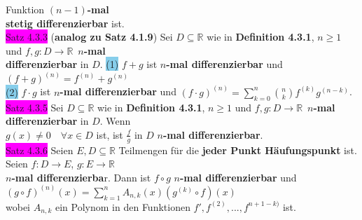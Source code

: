 \documentclass[10pt]{article}
\begin{document}
                Funktion \textbf{$(n-1)$-mal \\
        \indent stetig differenzierbar} ist.\\
\colorbox{magenta}{Satz 4.3.3} (\textbf{analog zu Satz 4.1.9}) Sei 
                \textcolor{NavyBlue}{$D\subseteq\mathbb{R}$} wie in 
                \textbf{Definition 4.3.1}, \textcolor{NavyBlue}{$n\geqslant1$} und 
                \textcolor{NavyBlue}{$f,g:D\longrightarrow\mathbb{R}$}\,
                \textbf{$n$-mal \\
        \indent differenzierbar} in \textcolor{NavyBlue}{$D$}. \quad
                \colorbox{SkyBlue}{(1)} \textcolor{NavyBlue}{$f+g$} 
                ist $n$\textbf{-mal differenzierbar} und 
                \textcolor{NavyBlue}{$(f+g)^{(n)}=f^{(n)}+g^{(n)}$}\\
        \indent \colorbox{SkyBlue}{(2)} \textcolor{NavyBlue}{$f\cdot g$}
                ist $n$\textbf{-mal differenzierbar} 
                und \textcolor{NavyBlue}{
                $(f\cdot g)^{(n)}=\sum_{k=0}^n\binom{n}{k}f^{(k)}g^{(n-k)}$}. \\
\colorbox{magenta}{Satz 4.3.5} Sei \textcolor{NavyBlue}{$D\subseteq\mathbb{R}$} wie in 
                \textbf{Definition 4.3.1}, 
                \textcolor{NavyBlue}{$n\geqslant1$} und 
                \textcolor{NavyBlue}{$f,g:D\longrightarrow\mathbb{R}$}\,
                \textbf{$n$-mal differenzierbar} in \textcolor{NavyBlue}{$D$}. Wenn \\
        \indent \textcolor{NavyBlue}{$g(x)\neq0\quad\forall x\in D$} ist, 
                ist \textcolor{NavyBlue}{$\frac{f}{g}$} 
                in \textcolor{NavyBlue}{$D$} $n$\textbf{-mal differenzierbar}. \\
\colorbox{magenta}{Satz 4.3.6} Seien \textcolor{NavyBlue}{$E,D\subseteq\mathbb{R}$} Teilmengen 
                für die \textbf{jeder Punkt Häufungspunkt} ist. Seien 
                \textcolor{NavyBlue}{$f:D\longrightarrow E$},
                \textcolor{NavyBlue}{$g:E\longrightarrow\mathbb{R}$} \\
        \indent \textbf{$n$-mal differenzierba}r.
                Dann ist \textcolor{NavyBlue}{$f\circ g$} 
                $n$\textbf{-mal differenzierbar} und 
                \textcolor{NavyBlue}{
                $(g\circ f)^{(n)}(x)=\sum_{k=1}^nA_{n,k}(x)(g^{(k)}\circ f)(x)$}\\
        \indent wobei \textcolor{NavyBlue}{$A_{n,k}$} ein Polynom in den Funktionen 
                \textcolor{NavyBlue}{$f',f^{(2)},...,f^{n+1-k)}$} ist. \\
\end{document}
